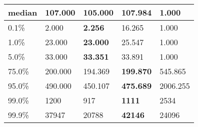\begin{table}[H]
\begin{tabular}{|l|m{10em}|m{10em}|m{10em}|m{10em}|}
\hline median & 107.000 & 105.000 & \bfseries 107.984 & \cellcolor[rgb]{0.9, 0.54, 0.52} 1.000 \\
\hline 0.1\% & 2.000 & \bfseries 2.256 & \cellcolor[rgb]{0.9, 0.54, 0.52} 16.265 & 1.000 \\
\hline 1.0\% & 23.000 & \bfseries 23.000 & 25.547 & \cellcolor[rgb]{0.9, 0.54, 0.52} 1.000 \\
\hline 5.0\% & 33.000 & \bfseries 33.351 & 33.891 & \cellcolor[rgb]{0.9, 0.54, 0.52} 1.000 \\
\hline 75.0\% & 200.000 & 194.369 & \bfseries 199.870 & \cellcolor[rgb]{0.9, 0.54, 0.52} 545.865 \\
\hline 95.0\% & 490.000 & 450.107 & \bfseries 475.689 & \cellcolor[rgb]{0.9, 0.54, 0.52} 2006.255 \\
\hline 99.0\% & 1200 & 917 & \bfseries 1111 & \cellcolor[rgb]{0.9, 0.54, 0.52} 2534 \\
\hline 99.9\% & 37947 & \cellcolor[rgb]{0.9, 0.54, 0.52} 20788 & \bfseries 42146 & 24096 \\
\hline
\end{tabular}
\end{table}
